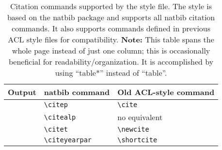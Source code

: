 \begin{table*}[htbp]
\centering
\begin{tabular}{lll}
\hline
Output & natbib command & Old ACL-style command\\
\toprule
\citep{Gusfield:97} & \verb|\citep| & \verb|\cite| \\
\citealp{Gusfield:97} & \verb|\citealp| & no equivalent \\
\citet{Gusfield:97} & \verb|\citet| & \verb|\newcite| \\
\citeyearpar{Gusfield:97} & \verb|\citeyearpar| & \verb|\shortcite| \\
\bottomrule
\end{tabular}
\caption{\label{citation-guide}
Citation commands supported by the style file.
The style is based on the natbib package and supports all natbib citation commands.
It also supports commands defined in previous ACL style files for compatibility. \textbf{Note:} This table spans the whole page instead of just one column; this is occasionally beneficial for readability/organization. It is accomplished by using ``table*'' instead of ``table''.
}
\end{table*}